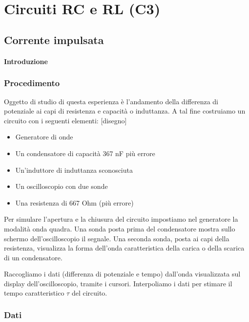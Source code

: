 \chapter{Circuiti RC e RL (C3)}

\section{Corrente impulsata}
\subsubsection{Introduzione}

\subsection{Procedimento}

Oggetto di studio di questa esperienza è l'andamento della differenza di potenziale ai capi di resistenza e capacità o induttanza.
A tal fine costruiamo un circuito con i seguenti elementi:
[disegno]

\begin{itemize}
  \item Generatore di onde
  \item Un condensatore di capacità 367 nF più errore
  \item Un'induttore di induttanza sconosciuta
  \item Un oscilloscopio con due sonde
  \item Una resistenza di 667 Ohm (più errore)
\end{itemize}

Per simulare l'apertura e la chiusura del circuito impostiamo nel generatore la modalità onda quadra. Una sonda posta prima del condensatore mostra sullo schermo dell'oscilloscopio il segnale.  
Una seconda sonda, posta ai capi della resistenza, visualizza la forma dell'onda caratteristica della carica o della scarica di un condensatore.

Raccogliamo i dati (differenza di potenziale e tempo) dall'onda visualizzata sul display dell'oscilloscopio, tramite i cursori. Interpoliamo i dati per stimare il tempo caratteristico $\tau$ del circuito.

\subsection{Dati}


